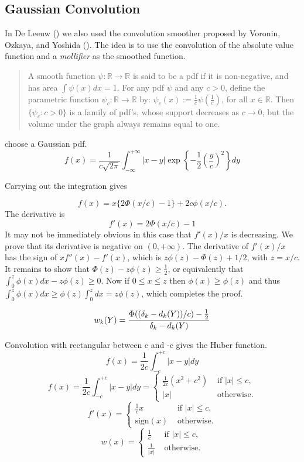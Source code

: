 \documentclass[
  12pt,
  letterpaper,
  DIV=11,
  numbers=noendperiod]{scrartcl}
\begin{document}
\subsection{Gaussian Convolution}\label{gaussian-convolution}

In De Leeuw () we also used the
convolution smoother proposed by Voronin, Ozkaya, and Yoshida
(). The idea is to use the
convolution of the absolute value function and a \emph{mollifier} as the
smoothed function.

\begin{quote}
A smooth function \(\psi:\mathbb{R}\rightarrow\mathbb{R}\) is said to be
a pdf if it is non-negative, and has area \(\int\psi(x)dx=1\). For any
pdf \(\psi\) and any \(c>0\), deﬁne the parametric function
\(\psi_c:\mathbb{R}\rightarrow\mathbb{R}\) by:
\(\psi_c(x):= \frac{1}{c}\psi (\frac{1}{c})\), for all
\(x\in\mathbb{R}\). Then \(\{\psi_c:c>0\}\) is a family of pdf's, whose
support decreases as \(c\rightarrow 0\), but the volume under the graph
always remains equal to one.
\end{quote}

choose a Gaussian pdf. \[
f(x)=\frac{1}{c\sqrt{2\pi}}\int_{-\infty}^{+\infty}|x-y|\exp\left\{-\frac12(\frac{y}{c})^2\right\}dy
\]

Carrying out the integration gives

\[
f(x)=x\{2\Phi(x/c)-1\}+2c\phi(x/c).
\] The derivative is \[
f'(x)=2\Phi(x/c)-1
\] It may not be immediately obvious in this case that \(f'(x)/x\) is
decreasing. We prove that its derivative is negative on \((0,+\infty)\).
The derivative of \(f'(x)/x\) has the sign of \(xf''(x)-f'(x)\), which
is \(z\phi(z)-\Phi(z)+1/2\), with \(z=x/c\). It remains to show that
\(\Phi(z)-z\phi(z)\geq\frac12\), or equivalently that
\(\int_0^z\phi(x)dx-z\phi(z)\geq 0\). Now if \(0\leq x\leq z\) then
\(\phi(x)\geq\phi(z)\) and thus
\(\int_0^z\phi(x)dx\geq\phi(z)\int_0^zdx=z\phi(z)\), which completes the
proof.

\[
w_k(Y)=
\frac{\Phi((\delta_k-d_k(Y))/c)-\frac12}{\delta_k-d_k(Y)}\\
\]

Convolution with rectangular between c and -c gives the Huber function.
\[
f(x)=\frac{1}{2c}\int_{-c}^{+c}|x-y|dy
\] \[
f(x)=\frac{1}{2c}\int_{-c}^{+c}|x-y|dy=\begin{cases}
\frac{1}{2c}(x^2+c^2)&\text{ if }|x|\leq c,\\
|x|&\text{ otherwise}.
\end{cases}
\] \[
f'(x)=\begin{cases}
\frac{1}{c}x&\text{ if }|x|\leq c,\\
\text{sign}(x)&\text{ otherwise}.
\end{cases}
\] \[
w(x)=\begin{cases}
\frac{1}{c}&\text{ if }|x|\leq c,\\
\frac{1}{|x|}&\text{ otherwise}.
\end{cases}
\]
\end{document}
